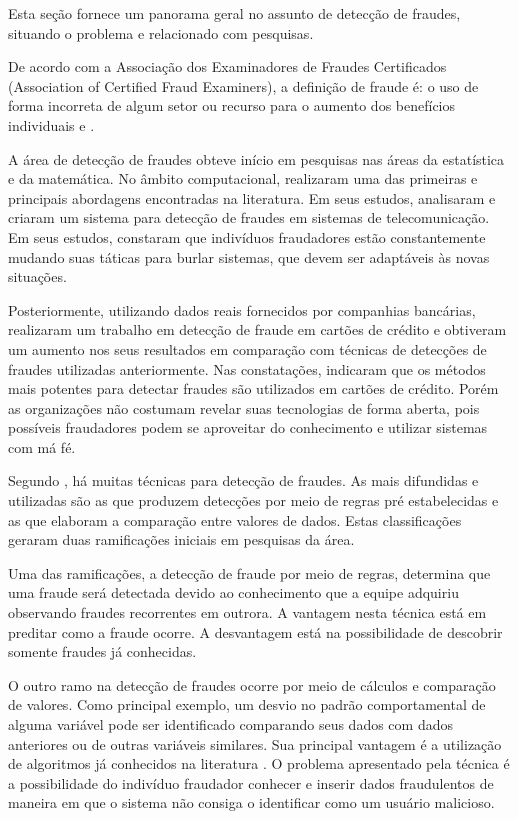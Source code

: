 \documentclass[smallextended]{svjour3}
\begin{document}
Esta seção fornece um panorama geral no assunto de detecção de fraudes, situando o problema e relacionado com pesquisas.

De acordo com a Associação dos Examinadores de Fraudes Certificados (Association of Certified Fraud Examiners), a definição de fraude é: o uso de forma incorreta de algum setor ou recurso para o aumento dos benefícios individuais \citep{Abdallah2016} e \citep{Allan2010}.

A área de detecção de fraudes obteve início em pesquisas nas áreas da estatística e da matemática. No âmbito computacional, \cite{Fawcett1997} realizaram uma das primeiras e principais abordagens encontradas na literatura. Em seus estudos, analisaram e criaram um sistema para detecção de fraudes em sistemas de telecomunicação. Em seus estudos, constaram que indivíduos fraudadores estão constantemente mudando suas táticas para burlar sistemas, que devem ser adaptáveis às novas situações.

Posteriormente, utilizando dados reais fornecidos por companhias bancárias, \cite{809570} realizaram um trabalho em detecção de fraude em cartões de crédito e obtiveram um aumento nos seus resultados em comparação com técnicas de detecções de fraudes utilizadas anteriormente. Nas constatações, indicaram que os métodos mais potentes para detectar fraudes são utilizados em cartões de crédito. Porém as organizações não costumam revelar suas tecnologias de forma aberta, pois possíveis fraudadores podem se aproveitar do conhecimento e utilizar sistemas com má fé.

Segundo \cite{Fawcett1997}, há muitas técnicas para detecção de fraudes. As mais difundidas e utilizadas são as que produzem detecções por meio de regras pré estabelecidas e as que elaboram a comparação entre valores de dados. Estas classificações geraram duas ramificações iniciais em pesquisas da área.

Uma das ramificações, a detecção de fraude por meio de regras, determina que uma fraude será detectada devido ao conhecimento que a equipe adquiriu observando fraudes recorrentes em outrora. A vantagem nesta técnica está em preditar como a fraude ocorre. A desvantagem está na possibilidade de descobrir somente fraudes já conhecidas.

O outro ramo na detecção de fraudes ocorre por meio de cálculos e comparação de valores. Como principal exemplo, um desvio no padrão comportamental de alguma variável pode ser identificado comparando seus dados com dados anteriores ou de outras variáveis similares. Sua principal vantagem é a utilização de algoritmos já conhecidos na literatura \citep{Fawcett1997}. O problema apresentado pela técnica é a possibilidade do indivíduo fraudador conhecer e inserir dados fraudulentos de maneira em que o sistema não consiga o identificar como um usuário malicioso.
\end{document}
